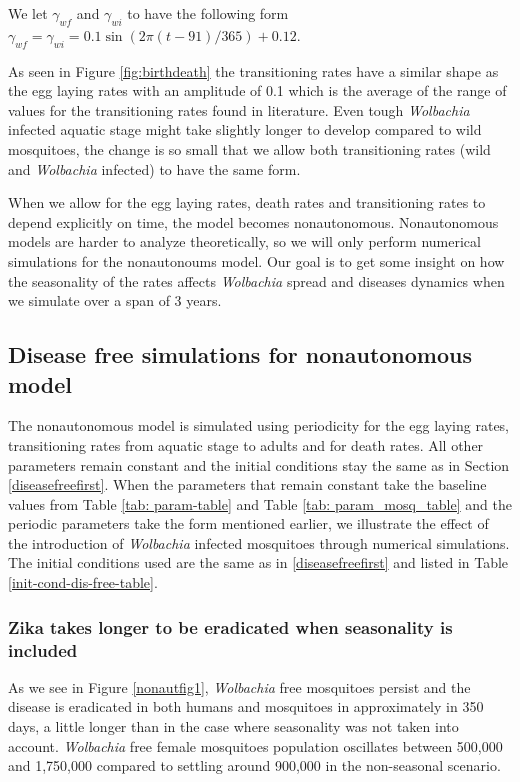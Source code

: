 \documentclass{ws-rv9x6}
\begin{document}
We let $\gamma_{wf}$ and $\gamma_{wi}$ to have the following form $\gamma_{wf}=\gamma_{wi}=0.1\sin\left(2\pi(t-91)/365\right)+0.12$.


As seen in Figure \ref{fig:birthdeath} the transitioning rates have a similar shape as the egg laying rates with an amplitude of 0.1 which is the average of the range of values for the transitioning rates found in literature.  Even tough \textit{Wolbachia} infected aquatic stage might take slightly longer to develop compared to wild mosquitoes, the change is so small that we allow both transitioning rates (wild and \textit{Wolbachia} infected) to have the same form.

When we allow for the egg laying rates, death rates and transitioning rates to depend explicitly on time, the model becomes nonautonomous. Nonautonomous models are harder to analyze theoretically, so we will only perform numerical simulations for the nonautonoums model. Our goal is to get some insight on how the seasonality of the rates affects \textit{Wolbachia} spread and diseases dynamics when we simulate over a span of 3 years.

\subsection{Disease free simulations for nonautonomous model}
The nonautonomous model is simulated using periodicity for the egg laying rates, transitioning rates from aquatic stage to adults and for death rates. All other parameters remain constant and the initial conditions stay the same as in Section \ref{diseasefreefirst}. When the parameters that remain constant take the baseline values from Table \ref{tab: param-table} and Table \ref{tab: param_mosq_table} and the periodic parameters take the form mentioned earlier, we illustrate the effect of the introduction of \textit{Wolbachia} infected mosquitoes through numerical simulations. The initial conditions used are the same as in \ref{diseasefreefirst} and listed in Table \ref{init-cond-dis-free-table}.

\subsubsection{Zika takes longer to be eradicated when seasonality is included }
As we see in Figure \ref{nonautfig1}, \textit{Wolbachia} free mosquitoes persist and the disease is eradicated in both humans and mosquitoes in approximately in 350 days, a little longer than in the case where seasonality was not taken into account. \textit{Wolbachia} free female mosquitoes population oscillates between 500,000 and 1,750,000 compared to settling around 900,000 in the non-seasonal scenario. 
\end{document}

